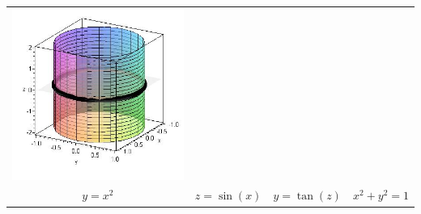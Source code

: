 \begin{center}
\begin{tabular}{cccc}
\includegraphics[width=\mywidth]{functions/cylinder-4}
\\
$y=x^2$ &
$z=\sin(x)$ &
$y=\tan(z)$ &
$x^2+y^2=1$
\end{tabular}
\end{center}

